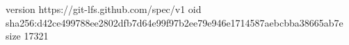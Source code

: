 version https://git-lfs.github.com/spec/v1
oid sha256:d42ce499788ee2802dfb7d64e99f97b2ee79e946e1714587aebcbba38665ab7e
size 17321
